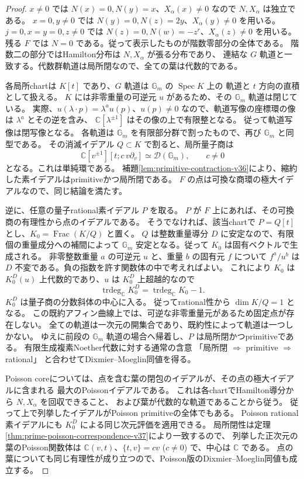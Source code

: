 \begin{proof}
$x\ne0$ では $N(x)=0,N(y)=x$、$X_\alpha(x)\ne0$ なので $N,X_\alpha$ は独立である。
$x=0,y\ne0$ では $N(y)=0,N(z)=2y$、$X_\alpha(y)\ne0$ を用いる。
$j=0,x=y=0,z\ne0$ では $N(z)=0,N(w)=-z^r$、$X_\alpha(z)\ne0$ を用いる。
残る $F$ では $N=0$ である。従って表示したものが階数零部分の全体である。
階数二の部分ではHamilton分布は $N,X_\alpha$ が張る分布であり、
連結な $G$ 軌道と一致する。代数群軌道は局所閉なので、全ての葉は代数的である。

各局所chartは $K[t]$ であり、$G$ 軌道は $\mathbb G_m$ の $\operatorname{Spec}K$ 上の
軌道と $t$ 方向の直積として扱える。
$K$ には非零重量の可逆元 $u$ があるため、その $\mathbb G_m$ 軌道は閉じている。
実際、$u(\lambda\cdot p)=\lambda^a u(p)$、$u(p)\ne0$ なので、軌道写像の座標環の像は
$\lambda^a$ とその逆を含み、
$\mathbb C[\lambda^{\pm1}]$ はその像の上で有限整となる。
従って軌道写像は閉写像となる。
各軌道は $\mathbb G_m$ を有限部分群で割ったもので、再び $\mathbb G_m$ と同型である。
その消滅イデアル $Q\subset K$ で割ると、局所量子商は
\[
 \mathbb C[v^{\pm1}][t;c\,v\partial_v]\simeq\mathcal D(\mathbb G_m),\qquad c\ne0
\]
となる。これは単純環である。
補題\ref{lem:primitive-contraction-v36}により、縮約した素イデアルはprimitiveかつ局所閉である。
$F$ の点は可換な商環の極大イデアルなので、同じ結論を満たす。

逆に、任意の量子rational素イデアル $P$ を取る。
$P$ が $F$ 上にあれば、その可換商の有理性から点のイデアルである。
そうでなければ、該当chartで $P=Q[t]$ とし、$K_0=\operatorname{Frac}(K/Q)$ と置く。
$Q$ は整数重量導分 $D$ に安定なので、有限個の重量成分への補間によって
$\mathbb G_m$ 安定となる。従って $K_0$ は固有ベクトルで生成される。
非零整数重量 $a$ の可逆元 $u$ と、重量 $b$ の固有元 $f$ について
$f^a/u^b$ は $D$ 不変である。負の指数を許す関数体の中で考えればよい。
これにより $K_0$ は $K_0^D(u)$ 上代数的であり、$u$ は $K_0^D$ 上超越的なので
\[
 \operatorname{trdeg}_{\mathbb C}K_0^D
 =\operatorname{trdeg}_{\mathbb C}K_0-1.
\]
$K_0^D$ は量子商の分数斜体の中心に入る。
従ってrational性から $\dim K/Q=1$ となる。
この既約アフィン曲線上では、可逆な非零重量元があるため固定点が存在しない。
全ての軌道は一次元の開集合であり、既約性によって軌道は一つしかない。
ゆえに前段の $\mathbb G_m$ 軌道の場合へ帰着し、$P$ は局所閉かつprimitiveである。
有限生成複素Noether代数に対する通常の含意
「局所閉 $\Rightarrow$ primitive $\Rightarrow$ rational」
\cite[\S8]{LecoutreSierra2019}と合わせてDixmier--Moeglin同値を得る。

Poisson coreについては、点を含む葉の閉包のイデアルが、その点の極大イデアルに含まれる
最大のPoissonイデアルである。
これは各chartでHamilton導分から $N,X_\alpha$ を回収できること、
および葉が代数的な軌道であることから従う。
従って上で列挙したイデアルがPoisson primitiveの全体でもある。
Poisson rational素イデアルにも $K_0^D$ による同じ次元評価を適用できる。
局所閉性は定理\ref{thm:prime-poisson-correspondence-v37}により一致するので、
列挙した正次元の葉のPoisson関数体は $\mathbb C(v,t)$、$\{t,v\}=cv$ ($c\ne0$) で、中心は $\mathbb C$ である。
点の葉についても同じ有理性が成り立つので、Poisson版のDixmier--Moeglin同値も成立する。
\end{proof}

